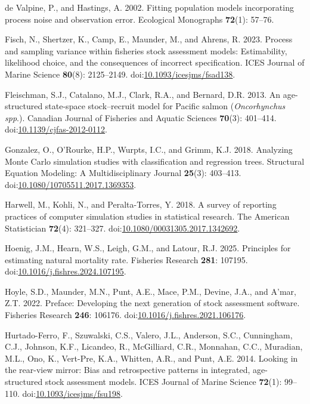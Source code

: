 \documentclass[
  12pt,
]{article}
\newlength{\cslhangindent}
\newenvironment{CSLReferences}[2] %
 {\begin{list}{}{%
  \setlength{\itemindent}{0pt}
  \setlength{\leftmargin}{0pt}
  \setlength{\parsep}{0pt}
  \ifodd #1
   \setlength{\leftmargin}{\cslhangindent}
   \setlength{\itemindent}{-1\cslhangindent}
  \fi
  \setlength{\itemsep}{#2\baselineskip}}}
 {\end{list}}
\begin{document}
\begin{CSLReferences}{1}{0}
{de Valpine, P., and Hastings, A.} 2002. Fitting population models
incorporating process noise and observation error. Ecological Monographs
\textbf{72}(1): 57--76.

Fisch, N., Shertzer, K., Camp, E., Maunder, M., and Ahrens, R. 2023.
Process and sampling variance within fisheries stock assessment models:
Estimability, likelihood choice, and the consequences of incorrect
specification. ICES Journal of Marine Science \textbf{80}(8):
2125--2149.
doi:\href{https://doi.org/10.1093/icesjms/fsad138}{10.1093/icesjms/fsad138}.

Fleischman, S.J., Catalano, M.J., Clark, R.A., and Bernard, D.R. 2013.
An age-structured state-space stock--recruit model for {P}acific salmon
(\emph{{O}ncorhynchus spp}.). Canadian Journal of Fisheries and Aquatic
Sciences \textbf{70}(3): 401--414.
doi:\href{https://doi.org/10.1139/cjfas-2012-0112}{10.1139/cjfas-2012-0112}.

Gonzalez, O., O'Rourke, H.P., Wurpts, I.C., and Grimm, K.J. 2018.
Analyzing {M}onte {C}arlo simulation studies with classification and
regression trees. Structural Equation Modeling: A Multidisciplinary
Journal \textbf{25}(3): 403--413.
doi:\href{https://doi.org/10.1080/10705511.2017.1369353}{10.1080/10705511.2017.1369353}.

Harwell, M., Kohli, N., and Peralta-Torres, Y. 2018. A survey of
reporting practices of computer simulation studies in statistical
research. The American Statistician \textbf{72}(4): 321--327.
doi:\href{https://doi.org/10.1080/00031305.2017.1342692}{10.1080/00031305.2017.1342692}.

Hoenig, J.M., Hearn, W.S., Leigh, G.M., and Latour, R.J. 2025.
Principles for estimating natural mortality rate. Fisheries Research
\textbf{281}: 107195.
doi:\href{https://doi.org/10.1016/j.fishres.2024.107195}{10.1016/j.fishres.2024.107195}.

Hoyle, S.D., Maunder, M.N., Punt, A.E., Mace, P.M., Devine, J.A., and
A'mar, Z.T. 2022. Preface: Developing the next generation of stock
assessment software. Fisheries Research \textbf{246}: 106176.
doi:\href{https://doi.org/10.1016/j.fishres.2021.106176}{10.1016/j.fishres.2021.106176}.

Hurtado-Ferro, F., Szuwalski, C.S., Valero, J.L., Anderson, S.C.,
Cunningham, C.J., Johnson, K.F., Licandeo, R., McGilliard, C.R.,
Monnahan, C.C., Muradian, M.L., Ono, K., Vert-Pre, K.A., Whitten, A.R.,
and Punt, A.E. 2014. Looking in the rear-view mirror: Bias and
retrospective patterns in integrated, age-structured stock assessment
models. ICES Journal of Marine Science \textbf{72}(1): 99--110.
doi:\href{https://doi.org/10.1093/icesjms/fsu198}{10.1093/icesjms/fsu198}.


\end{CSLReferences}
\end{document}
